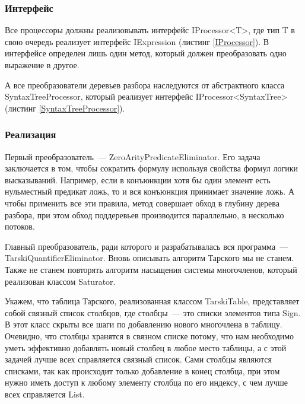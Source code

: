 \subsubsection{Интерфейс}

Все процессоры должны реализовывать интерфейс IProcessor<T>, где тип T в свою очередь реализует интерфейс IExpression (листинг \ref{IProcessor}). В интерфейсе определен лишь один метод, который должен преобразовать одно выражение в другое.





А все преобразователи деревьев разбора наследуются от абстрактного класса SyntaxTreeProcessor, который реализует интерфейс IProcessor<SyntaxTree> (листинг \ref{SyntaxTreeProcessor}).


\subsubsection{Реализация}

Первый преобразователь~--- ZeroArityPredicateEliminator. Его задача заключается в том, чтобы сократить формулу используя свойства формул логики высказываний. Например, если в конъюнкции хотя бы один элемент есть нульместный предикат ложь, то и вся конъюнкция принимает значение ложь. А чтобы применить все эти правила, метод совершает обход в глубину дерева разбора, при этом обход поддеревьев производится параллельно, в несколько потоков.

Главный преобразователь, ради которого и разрабатывалась вся программа~--- TarskiQuantifierEliminator. Вновь описывать алгоритм Тарского мы не станем. Также не станем повторять алгоритм насыщения системы многочленов, который реализован классом Saturator.

Укажем, что таблица Тарского, реализованная классом TarskiTable, представляет собой связный список столбцов, где столбцы~--- это списки элементов типа Sign. В этот класс скрыты все шаги по добавлению нового многочлена в таблицу. Очевидно, что столбцы хранятся в связном списке потому, что нам необходимо уметь эффективно добавлять новый столбец в любое место таблицы, а с этой задачей лучше всех справляется связный список. Сами столбцы являются списками, так как происходит только добавление в конец столбца, при этом нужно иметь доступ к любому элементу столбца по его индексу, с чем лучше всех справляется List.

